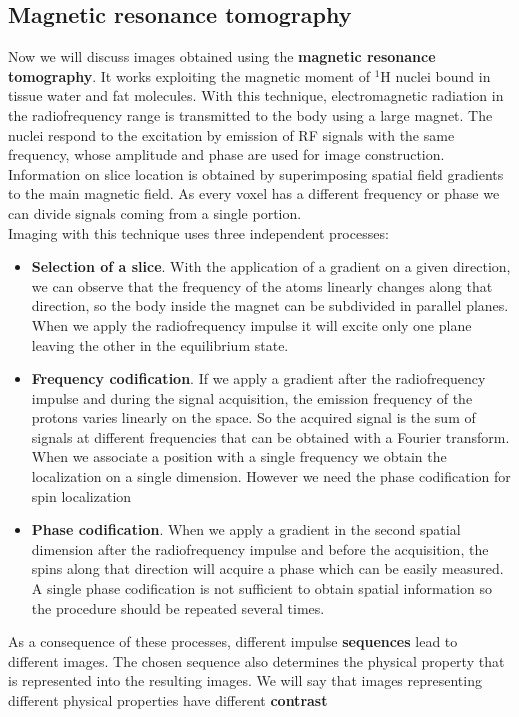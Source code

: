 \subsection{Magnetic resonance tomography}

Now we will discuss images obtained using the \textbf{magnetic resonance tomography}. It works exploiting the magnetic moment of $^{1}$H nuclei bound in tissue water and fat molecules. With this technique, electromagnetic radiation in the radiofrequency range is transmitted to the body using a large magnet. The nuclei respond to the excitation by emission of RF signals with the same frequency, whose amplitude and phase are used for image construction. Information on slice location is obtained by superimposing spatial field gradients to the main magnetic field. As every voxel has a different frequency or phase we can divide signals coming from a single portion.\\

Imaging with this technique uses three independent processes:
\begin{itemize}
 \item \textbf{Selection of a slice}. With the application of a gradient on a given direction, we can observe that the frequency of the atoms linearly changes along that direction, so the body inside the magnet can be subdivided in parallel planes. When we apply the radiofrequency impulse it will excite only one plane leaving the other in the equilibrium state.
 \item \textbf{Frequency codification}. If we apply a gradient after the radiofrequency impulse and during the signal acquisition, the emission frequency of the protons varies linearly on the space. So the acquired signal is the sum of signals at different frequencies that can be obtained with a Fourier transform. When we associate a position with a single frequency we obtain the localization on a single dimension. However we need the phase codification for spin localization
 \item \textbf{Phase codification}. When we apply a gradient in the second spatial dimension after the radiofrequency impulse and before the acquisition, the spins along that direction will acquire a phase which can be easily measured. A single phase codification is not sufficient to obtain spatial information so the procedure should be repeated several times.
\end{itemize}

As a consequence of these processes, different impulse \textbf{sequences} lead to different images. The chosen sequence also determines the physical property that is represented into the resulting images. We will say that images representing different physical properties have different \textbf{contrast}

